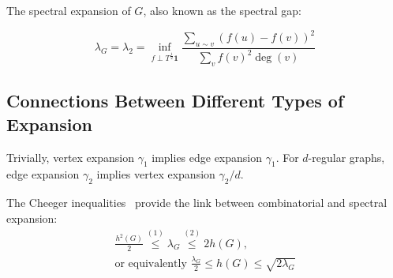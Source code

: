 The spectral expansion of $G$, also known as the spectral gap:

\begin{equation}
    \lambda_G=\lambda_2=\inf_{f \perp T^{\frac{1}{2}}\mathbf{1}}
    \frac{\sum_{u \sim v}{(f(u)-f(v))^2}}{\sum_{v}{f(v)^2\deg(v)}}
\end{equation}

%
%

\subsection{Connections Between Different Types of Expansion}

Trivially, vertex expansion $\gamma_1$ implies edge expansion $\gamma_1$.
For $d$-regular graphs, edge expansion $\gamma_2$ implies vertex expansion $\gamma_2/d$.

The Cheeger inequalities~\cite{che69,hlw06,chu07} provide the link
between combinatorial and spectral expansion:
\begin{gather}
    \label{eq:cheeger-inequalities}
    \frac{h^2(G)}{2}\overset{(1)}{\leq}\lambda_G\overset{(2)}{\leq}2h(G),\\
    \text{or equivalently }\frac{\lambda_G}{2}\leq h(G)\leq\sqrt{2\lambda_G}
\end{gather}

